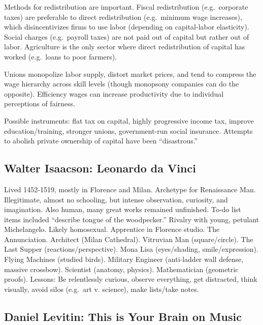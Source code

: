 \documentclass[
]{article}
\begin{document}
Methods for redistribution are important. Fiscal redistribution
(e.g.~corporate taxes) are preferable to direct redistribution
(e.g.~minimum wage increases), which disincentivizes firms to use labor
(depending on capital-labor elasticity). Social charges (e.g.~payroll
taxes) are not paid out of capital but rather out of labor. Agriculture
is the only sector where direct redistribution of capital has worked
(e.g.~loans to poor farmers).

Unions monopolize labor supply, distort market prices, and tend to
compress the wage hierarchy across skill levels (though monopsony
companies can do the opposite). Efficiency wages can increase
productivity due to individual perceptions of fairness.

Possible instruments: flat tax on capital, highly progressive income
tax, improve education/training, stronger unions, government-run social
insurance. Attempts to abolish private ownership of capital have been
``disastrous.''

\hypertarget{walter-isaacson-leonardo-da-vinci}{%
\subsection{Walter Isaacson: Leonardo da
Vinci}\label{walter-isaacson-leonardo-da-vinci}}

Lived 1452-1519, mostly in Florence and Milan. Archetype for Renaissance
Man. Illegitimate, almost no schooling, but intense observation,
curiosity, and imagination. Also human, many great works remained
unfinished. To-do list items included ``describe tongue of the
woodpecker.'' Rivalry with young, petulant Michelangelo. Likely
homosexual. Apprentice in Florence studio. The Annunciation. Architect
(Milan Cathedral). Vitruvian Man (square/circle). The Last Supper
(reactions/perspective). Mona Lisa (eyes/shading, smile/expression).
Flying Machines (studied birds). Military Engineer (anti-ladder wall
defense, massive crossbow). Scientist (anatomy, physics). Mathematician
(geometric proofs). Lessons: Be relentlessly curious, observe
everything, get distracted, think visually, avoid silos (e.g.~art v.
science), make lists/take notes.

\hypertarget{daniel-levitin-this-is-your-brain-on-music}{%
\subsection{Daniel Levitin: This is Your Brain on
Music}\label{daniel-levitin-this-is-your-brain-on-music}}
\end{document}
